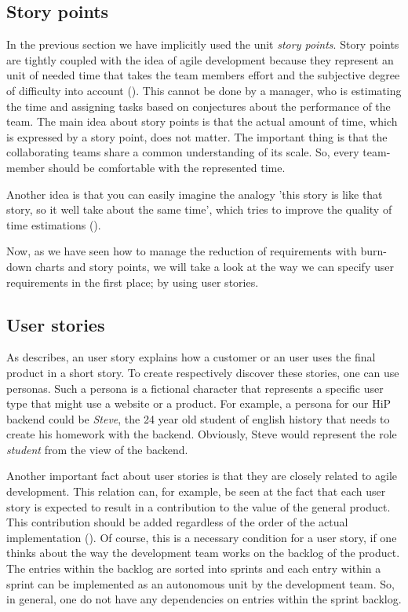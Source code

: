 \subsection{Story points}
\label{storyPoints}
In the previous section we have implicitly used the unit  \emph{story points}. Story points are tightly coupled with the idea of agile development because they represent an unit of needed time that takes the team members effort and the subjective degree of difficulty into account (\cite{ScrumMeth}). This cannot be done by a manager, who is estimating the time and assigning tasks based on conjectures about the performance of the team. The main idea about story points is that the actual amount of time, which is expressed by a story point, does not matter. The important thing is that the collaborating teams share a common understanding of its scale. So, every team-member should be comfortable with the represented time. 

Another idea is that you can easily imagine the analogy 'this story is like that story, so it well take about the same time', which tries to improve the quality of time estimations (\cite{cohn2004user}).

Now, as we have seen how to manage the reduction of requirements with burn-down charts and story points, we will take a look at the way we can specify user requirements in the first place; by using user stories.

\subsection{User stories}
As \cite{Pichler:2010aa} describes, an user story explains how a customer or an user uses the final product in a short story. To create respectively discover these stories, one can use personas. Such a persona is a fictional character that represents a specific user type that might use a website or a product. For example, a persona for our \ac{HiP} backend could be \emph{Steve}, the 24 year old student of english history that needs to create his homework with the backend. Obviously, Steve would represent the role \emph{student} from the view of the backend. 

Another important fact about user stories is that they are closely related to agile development. This relation can, for example, be seen at the fact that each user story is expected to result in a contribution to the value of the general product. This contribution should be added regardless of the order of the actual implementation (\cite{Alliance:2013aa}). Of course, this is a necessary condition for a user story, if one thinks about the way the development team works on the backlog of the product. The entries within the backlog are sorted into sprints and each entry within a sprint can be implemented as an autonomous unit by the development team. So, in general, one do not have any dependencies on entries within the sprint backlog.

